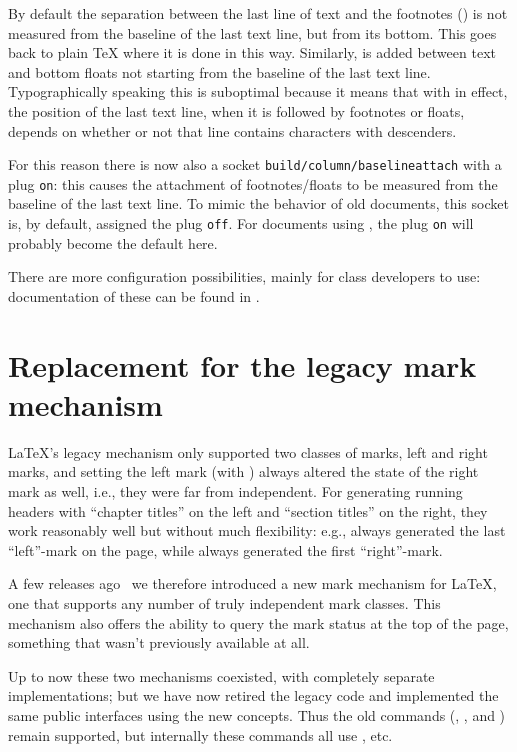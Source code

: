 \documentclass{ltnews}
\providecommand\socket[1]{\texttt{#1}}
\providecommand\plug[1]{\texttt{#1}}
\begin{document}
By default the separation between the last line of text and the
footnotes () is not measured from the baseline of
the last text line, but from its bottom. This goes back to plain \TeX{}
where it is done in this way.  Similarly,  is
added between text and bottom floats not starting from the baseline of
the last text line. Typographically speaking this is suboptimal
because it means that with  in effect, the position of
the last text line, when it is followed by footnotes or floats, depends on
whether or not that line contains characters with descenders.

For this reason there is now also a socket
\socket{build/column/baselineattach} with a plug
\plug{on}: this causes the attachment of footnotes/floats to be measured
from the baseline of the last text line. To mimic the behavior of old
documents, this socket is, by default, assigned the plug \plug{off}. 
For documents using
, the plug \plug{on} will probably become the default here. 

There are more configuration possibilities, mainly for class
developers to use: documentation of these can be found in
\cite[\S54 ltoutput.dtx]{41:source2e}.


\section{Replacement for the legacy mark mechanism}

\LaTeX{}'s legacy mechanism only supported two classes of marks, left and right
marks, and setting the left mark (with ) always altered
the state of the right mark as well, i.e., they were far from
independent. For generating running headers with \enquote{chapter
  titles} on the left and \enquote{section titles} on the right, they
work reasonably well but without much flexibility: e.g., 
always generated the last \enquote{left}-mark on the page, while
 always generated the first \enquote{right}-mark.

A few releases ago~\cite[p.\,76]{41:ltnews} we therefore introduced a new
mark mechanism for \LaTeX{}, one that supports any number of truly
independent mark classes. This mechanism also offers the ability to
query the mark status at the top of the page, something that wasn't
previously available at all.

Up to now these two mechanisms coexisted, with completely separate
implementations; but we have now retired the legacy code and
implemented the same public interfaces using the new concepts.  Thus
the old commands (, ,  and
) remain supported, but internally these commands all
use , etc.
\end{document}
